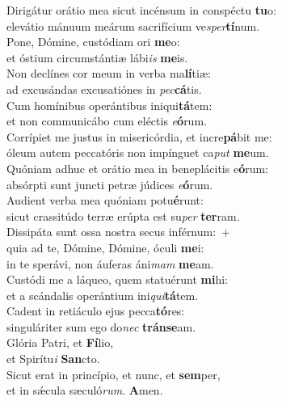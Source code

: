 \evenverse Dirigátur orátio mea sicut incénsum in conspéctu \textbf{tu}o:~\*\\
\evenverse elevátio mánuum meárum sacrifícium ve\textit{sper}\textbf{tí}num.\\
\oddverse Pone, Dómine, custódiam ori \textbf{me}o:~\*\\
\oddverse et óstium circumstántiæ lábi\textit{is} \textbf{me}is.\\
\evenverse Non declínes cor meum in verba ma\textbf{lí}tiæ:~\*\\
\evenverse ad excusándas excusatiónes in \textit{pec}\textbf{cá}tis.\\
\oddverse Cum homínibus operántibus iniqui\textbf{tá}tem:~\*\\
\oddverse et non communicábo cum eléctis \textit{e}\textbf{ó}rum.\\
\evenverse Corrípiet me justus in misericórdia, et incre\textbf{pá}bit me:~\*\\
\evenverse óleum autem peccatóris non impínguet ca\textit{put} \textbf{me}um.\\
\oddverse Quóniam adhuc et orátio mea in beneplácitis e\textbf{ó}rum:~\*\\
\oddverse absórpti sunt juncti petræ júdices \textit{e}\textbf{ó}rum.\\
\evenverse Audient verba mea quóniam potu\textbf{é}runt:~\*\\
\evenverse sicut crassitúdo terræ erúpta est su\textit{per} \textbf{ter}ram.\\
\oddverse Dissipáta sunt ossa nostra secus inférnum:~+\\
\oddverse  quia ad te, Dómine, Dómine, óculi \textbf{me}i:~\*\\
\oddverse in te sperávi, non áuferas áni\textit{mam} \textbf{me}am.\\
\evenverse Custódi me a láqueo, quem statuérunt \textbf{mi}hi:~\*\\
\evenverse et a scándalis operántium ini\textit{qui}\textbf{tá}tem.\\
\oddverse Cadent in retiáculo ejus pecca\textbf{tó}res:~\*\\
\oddverse singuláriter sum ego do\textit{nec} \textbf{trán}\textbf{se}am.\\
\evenverse Glória Patri, et \textbf{Fí}lio,~\*\\
\evenverse et Spirítu\textit{i} \textbf{San}cto.\\
\oddverse Sicut erat in princípio, et nunc, et \textbf{sem}per,~\*\\
\oddverse et in sǽcula sæculó\textit{rum}. \textbf{A}men.\\
